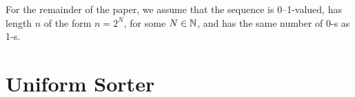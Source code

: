 \documentclass{article}
\begin{document}
For the remainder of the paper, we assume that the sequence
	is 0--1-valued,
	has length $n$ of the form $n = 2^N$, for some $N \in \mathbb{N}$,
and
	has the same number of 0-s as 1-s.



%
%
%
%
%
%
%






\section{Uniform Sorter}
\label{sec:unif}
\end{document}
